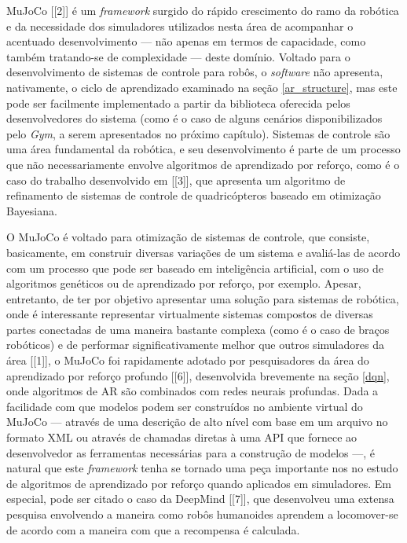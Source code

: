 \documentclass[cic,tc]{iiufrgs}
\begin{document}
MuJoCo [[2]] é um \textit{framework} surgido do rápido crescimento do ramo da
robótica e da necessidade dos simuladores utilizados nesta área de acompanhar
o acentuado desenvolvimento --- não apenas em termos de capacidade, como também
tratando-se de complexidade --- deste domínio. Voltado para o desenvolvimento de
sistemas de controle para robôs, o \textit{software} não apresenta, nativamente,
o ciclo de aprendizado examinado na seção \ref{ar_structure}, mas este pode ser
facilmente implementado a partir da biblioteca oferecida pelos desenvolvedores
do sistema (como é o caso de alguns cenários disponibilizados pelo \textit{Gym},
a serem apresentados no próximo capítulo). Sistemas de controle são uma área
fundamental da robótica, e seu desenvolvimento é parte de um processo que não
necessariamente envolve algoritmos de aprendizado por reforço, como é o caso do
trabalho desenvolvido em [[3]], que apresenta um algoritmo de refinamento de
sistemas de controle de quadricópteros baseado em otimização Bayesiana.


O MuJoCo é voltado para otimização de sistemas de controle, que consiste,
basicamente, em construir diversas variações de um sistema e avaliá-las de
acordo com um processo que pode ser baseado em inteligência artificial, com o
uso de algoritmos genéticos ou de aprendizado por reforço, por exemplo. Apesar,
entretanto, de ter por objetivo apresentar uma solução para sistemas de
robótica, onde é interessante representar virtualmente sistemas compostos de
diversas partes conectadas de uma maneira bastante complexa (como é o caso de
braços robóticos) e de performar significativamente melhor que outros
simuladores da área [[1]], o MuJoCo foi rapidamente adotado por pesquisadores da
área do aprendizado por reforço profundo [[6]], desenvolvida brevemente na seção
\ref{dqn}, onde algoritmos de AR são combinados com redes neurais profundas.
Dada a facilidade com que modelos podem ser construídos no ambiente virtual do
MuJoCo --- através de uma descrição de alto nível com base em um arquivo no
formato XML ou através de chamadas diretas à uma API que fornece ao
desenvolvedor as ferramentas necessárias para a construção de modelos ---, é
natural que este \textit{framework} tenha se tornado uma peça importante nos
no estudo de algoritmos de aprendizado por reforço quando aplicados em
simuladores. Em especial, pode ser citado o caso da DeepMind [[7]], que
desenvolveu uma extensa pesquisa envolvendo a maneira como robôs humanoides
aprendem a locomover-se de acordo com a maneira com que a recompensa é
calculada.
\end{document}
